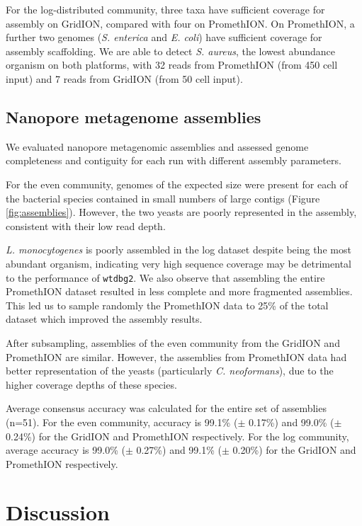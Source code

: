 \documentclass[a4paper,num-refs]{oup-contemporary}
\begin{document}
For the log-distributed community, three taxa have sufficient coverage for assembly on GridION, compared with four on PromethION. On PromethION, a further two genomes (\textit{S. enterica} and \textit{E. coli}) have sufficient coverage for assembly scaffolding. We are able to detect \textit{S. aureus}, the lowest abundance organism on both platforms, with 32 reads from PromethION (from 450 cell input) and 7 reads from GridION (from 50 cell input).

\subsection{Nanopore metagenome assemblies}

We evaluated nanopore metagenomic assemblies and assessed genome completeness and contiguity for each run with different assembly parameters.

For the even community, genomes of the expected size were present for each of the bacterial species contained in small numbers of large contigs (Figure \ref{fig:assemblies}). However, the two yeasts are poorly represented in the assembly, consistent with their low read depth. 

\textit{L. monocytogenes} is poorly assembled in the log dataset despite being the most abundant organism, indicating very high sequence coverage may be detrimental to the performance of \texttt{wtdbg2}. We also observe that assembling the entire PromethION dataset resulted in less complete and more fragmented assemblies. This led us to sample randomly the PromethION data to 25\% of the total dataset which improved the assembly results.

After subsampling, assemblies of the even community from the GridION and PromethION are similar. However, the assemblies from PromethION data had better representation of the yeasts (particularly \textit{C. neoformans}), due to the higher coverage depths of these species.

Average consensus accuracy was calculated for the entire set of assemblies (n=51). For the even community, accuracy is 99.1\% ($\pm$ 0.17\%) and 99.0\% ($\pm$ 0.24\%) for the GridION and PromethION respectively. For the log community, average accuracy is 99.0\% ($\pm$ 0.27\%) and 99.1\% ($\pm$ 0.20\%) for the GridION and PromethION respectively.

\section{Discussion}
\end{document}
